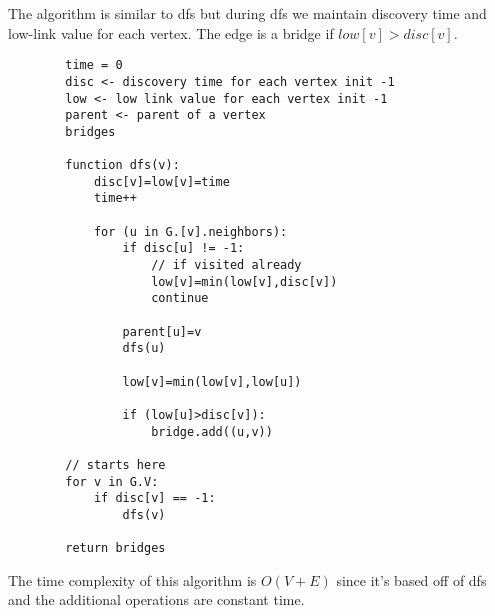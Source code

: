 \documentclass{article}
\begin{document}
\begin{enumerate}
\begin{enumerate}
    The algorithm is similar to dfs but during dfs we maintain discovery time and low-link value for each vertex.
    The edge is a bridge if $low[v]>disc[v]$.

    \begin{lstlisting}
        time = 0
        disc <- discovery time for each vertex init -1
        low <- low link value for each vertex init -1
        parent <- parent of a vertex
        bridges

        function dfs(v):
            disc[v]=low[v]=time
            time++

            for (u in G.[v].neighbors):
                if disc[u] != -1:
                    // if visited already
                    low[v]=min(low[v],disc[v])
                    continue

                parent[u]=v
                dfs(u)

                low[v]=min(low[v],low[u])

                if (low[u]>disc[v]):
                    bridge.add((u,v))
        
        // starts here
        for v in G.V:
            if disc[v] == -1:
                dfs(v)
        
        return bridges

    \end{lstlisting}

    The time complexity of this algorithm is $O(V+E)$ since it's based off of dfs and the additional operations are constant time.
  \end{enumerate}

\end{enumerate}
\end{document}
